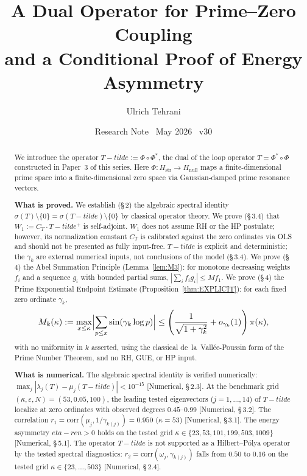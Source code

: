 \documentclass[11pt]{article}
\title{\vspace{-1.5em}\bfseries A Dual Operator for Prime--Zero Coupling\\[0.4em]
\large and a Conditional Proof of Energy Asymmetry}
\author{Ulrich Tehrani}
\date{Research Note \textperiodcentered\ May 2026 \textperiodcentered\ v30}
\def\Tt{T-tilde}%
\def\etaren{eta-ren}%
\newcommand{\Hstr}{H_{\mathrm{str}}}
\newcommand{\Hnull}{H_{\mathrm{null}}}
\newcommand{\etaren}{\eta_{\mathrm{ren}}}
\newcommand{\Tt}{\widetilde{T}}
\newcommand{\CT}{C_{T}}
\newcommand{\Wone}{W_1}
\begin{document}
\maketitle

\begin{abstract}
We introduce the operator $\Tt := \Phi \circ \Phi^*$,
the dual of the loop operator $T = \Phi^* \circ \Phi$ constructed in Paper~3
of this series. Here $\Phi\colon\Hstr \to \Hnull$ maps a
finite-dimensional prime space into a finite-dimensional zero space via
Gaussian-damped prime resonance vectors.

\textbf{What is proved.}
We establish (\S\,2) the algebraic spectral identity
$\sigma(T)\setminus\{0\} = \sigma(\Tt)\setminus\{0\}$
by classical operator theory.
We prove (\S\,3.4) that $\Wone := \CT\cdot\Tt^+$ is self-adjoint.
$\Wone$ does not assume RH or the HP postulate; however, its normalization
constant $\CT$ is calibrated against the zero ordinates via OLS and should
not be presented as fully input-free.
$\Tt$ is explicit and deterministic; the $\gamma_k$ are external numerical
inputs, not conclusions of the model (\S\,3.4).
We prove (\S\,4) the Abel Summation Principle (Lemma~\ref{lem:M3}):
for monotone decreasing weights $f_i$ and a sequence $g_i$ with bounded
partial sums, $|\sum_i f_i g_i| \leq M f_1$.
We prove (\S\,4) the Prime Exponential Endpoint Estimate
(Proposition~\ref{thm:EXPLICIT}): for each fixed zero ordinate $\gamma_k$,
\[
M_k(\kappa) := \max_{x \leq \kappa}\Bigl|\sum_{p \leq x}\sin(\gamma_k\log p)\Bigr|
\le \left(\frac{1}{\sqrt{1+\gamma_k^2}}+o_{\gamma_k}(1)\right)\pi(\kappa),
\]
with no uniformity in $k$ asserted,
using the classical de~la~Vall\'ee-Poussin form of the Prime Number Theorem,
and no RH, GUE, or HP input.

\textbf{What is numerical.}
The algebraic spectral identity is verified numerically:
$\max_j|\lambda_j(T)-\mu_j(\Tt)|<10^{-15}$ [Numerical, \S\,2.3].
At the benchmark grid $(\kappa,\varepsilon,N)=(53,0.05,100)$, the
leading tested eigenvectors ($j=1,\ldots,14$) of $\Tt$ localize at
zero ordinates with observed degrees $0.45$--$0.99$ [Numerical, \S\,3.2].
The correlation $r_1 = \mathrm{corr}(\mu_j,1/\gamma_{k(j)}) = 0.950$
($\kappa=53$) [Numerical, \S\,3.1].
The energy asymmetry $\etaren > 0$ holds on the tested grid
$\kappa\in\{23,53,101,199,503,1009\}$
[Numerical, \S\,5.1].
The operator $\Tt$ is not supported as a Hilbert--P\'olya operator
by the tested spectral diagnostics: $r_2 = \mathrm{corr}(\omega_j,\gamma_{k(j)})$
falls from $0.50$ to $0.16$ on the tested grid
$\kappa\in\{23,\ldots,503\}$ [Numerical, \S\,2.4].


\end{abstract}
\end{document}
